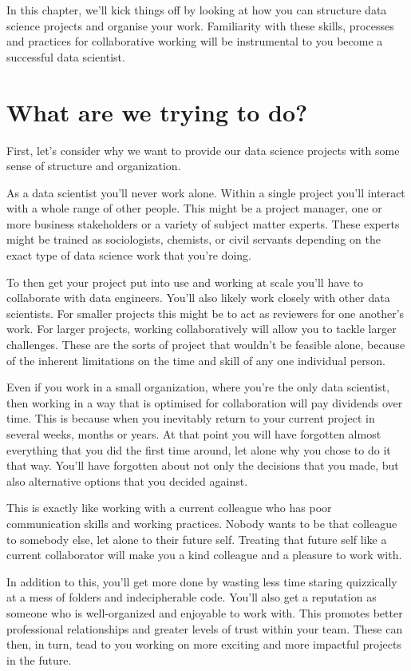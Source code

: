 \documentclass[
  letterpaper,
  DIV=11,
  numbers=noendperiod]{scrreprt}
\begin{document}
In this chapter, we'll kick things off by looking at how you can
structure data science projects and organise your work. Familiarity with
these skills, processes and practices for collaborative working will be
instrumental to you become a successful data scientist.

\section{What are we trying to do?}\label{what-are-we-trying-to-do}

First, let's consider why we want to provide our data science projects
with some sense of structure and organization.

As a data scientist you'll never work alone. Within a single project
you'll interact with a whole range of other people. This might be a
project manager, one or more business stakeholders or a variety of
subject matter experts. These experts might be trained as sociologists,
chemists, or civil servants depending on the exact type of data science
work that you're doing.

To then get your project put into use and working at scale you'll have
to collaborate with data engineers. You'll also likely work closely with
other data scientists. For smaller projects this might be to act as
reviewers for one another's work. For larger projects, working
collaboratively will allow you to tackle larger challenges. These are
the sorts of project that wouldn't be feasible alone, because of the
inherent limitations on the time and skill of any one individual person.

Even if you work in a small organization, where you're the only data
scientist, then working in a way that is optimised for collaboration
will pay dividends over time. This is because when you inevitably return
to your current project in several weeks, months or years. At that point
you will have forgotten almost everything that you did the first time
around, let alone why you chose to do it that way. You'll have forgotten
about not only the decisions that you made, but also alternative options
that you decided against.

This is exactly like working with a current colleague who has poor
communication skills and working practices. Nobody wants to be that
colleague to somebody else, let alone to their future self. Treating
that future self like a current collaborator will make you a kind
colleague and a pleasure to work with.

In addition to this, you'll get more done by wasting less time staring
quizzically at a mess of folders and indecipherable code. You'll also
get a reputation as someone who is well-organized and enjoyable to work
with. This promotes better professional relationships and greater levels
of trust within your team. These can then, in turn, tead to you working
on more exciting and more impactful projects in the future.
\end{document}
